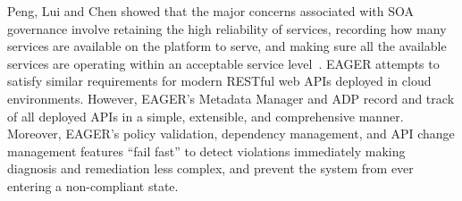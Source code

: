 Peng, Lui and Chen showed that
the major concerns associated with SOA governance 
involve retaining the high reliability of services, recording how many services
are available on the platform to serve, and making sure all the available 
services are operating within an acceptable service
level~\cite{4730489}. EAGER attempts to satisfy similar requirements for 
modern RESTful web APIs deployed in cloud environments. 
However, EAGER's Metadata Manager and ADP record and track of all deployed APIs 
in a simple, extensible, and comprehensive manner.  Moreover, EAGER's policy
validation, dependency management, and API change management features 
``fail fast'' to detect violations immediately making
diagnosis and remediation less complex, and prevent
the system from ever entering a non-compliant state.
